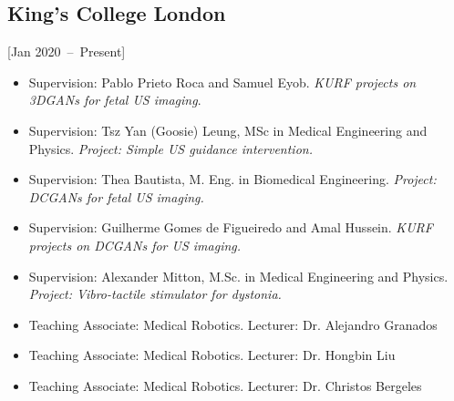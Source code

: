 \documentclass{mycv}
\begin{document}
\subsection{King's College London}[Jan 2020~--~Present]
\begin{itemize}
	\item 	Supervision: Pablo Prieto Roca and Samuel Eyob. 
		\textit{KURF projects on 3DGANs for fetal US imaging}. 
	\item 	Supervision: Tsz Yan (Goosie) Leung, MSc in Medical Engineering and Physics. 
		\textit{Project: Simple US guidance intervention.} 
	\item 	Supervision: Thea Bautista, M. Eng. in Biomedical Engineering. 
		\textit{Project: DCGANs for fetal US imaging.} 
	\item 	Supervision: Guilherme Gomes de Figueiredo and Amal Hussein. 
		\textit{KURF projects on DCGANs for US imaging.}
	\item 	Supervision: Alexander Mitton, M.Sc. in Medical Engineering and Physics. 
		\textit{Project: Vibro-tactile stimulator for dystonia.}
	\item Teaching Associate: Medical Robotics. Lecturer: Dr. Alejandro Granados 
	\item Teaching Associate: Medical Robotics. Lecturer: Dr. Hongbin Liu 
	\item Teaching Associate: Medical Robotics. Lecturer: Dr. Christos Bergeles 
\end{itemize}





\end{document}
